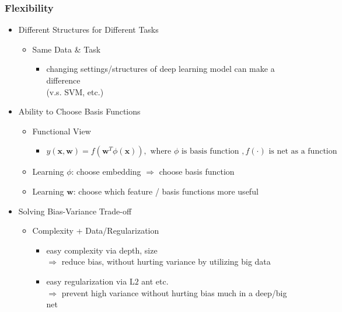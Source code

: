 \subsubsection{Flexibility}
\begin{itemize}
\item Different Structures for Different Tasks
	\begin{itemize}
	\item Same Data \& Task
		\begin{itemize}
		\item changing settings/structures of deep learning model can make a difference \\
		(v.s. SVM, etc.)
		\end{itemize}
	\end{itemize}

\item Ability to Choose Basis Functions
	\begin{itemize}
	\item Functional View
		\begin{itemize}
		\item $\displaystyle y(\mathbf {x}, \mathbf w)=f(\mathbf w^T\phi(\mathbf x)), \text{ where } \phi \text{ is basis function }, f(\cdot) \text{ is net as a function}$
		\end{itemize}
	\item Learning $\phi$: choose embedding $\Rightarrow$ choose basis function
	\item Learning $\mathbf w$: choose which feature / basis functions more useful
	\end{itemize}
	
\item Solving Bias-Variance Trade-off
	\begin{itemize}
	\item Complexity + Data/Regularization
		\begin{itemize}
		\item easy complexity via depth, size \\
		$\Rightarrow$ reduce bias, without hurting variance by utilizing big data
		\item easy regularization via L$2$ ant etc.\\ 
		$\Rightarrow$ prevent high variance without hurting bias much in a deep/big net
		\end{itemize}
	\end{itemize}
\end{itemize}

